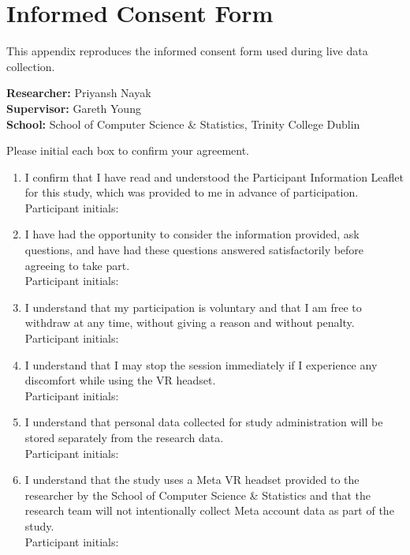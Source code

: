 \chapter{Informed Consent Form}
\label{app:consent}

\begingroup
\setlength{\parindent}{0pt}
\setlength{\parskip}{0.8em}

This appendix reproduces the informed consent form used during live data collection.

\textbf{Researcher:} Priyansh Nayak\\
\textbf{Supervisor:} Gareth Young\\
\textbf{School:} School of Computer Science \& Statistics, Trinity College Dublin

Please initial each box to confirm your agreement.

\begin{enumerate}
\item I confirm that I have read and understood the Participant Information Leaflet for this study, which was provided to me in advance of participation.\\[0.5em]
Participant initials: \hrulefill

\item I have had the opportunity to consider the information provided, ask questions, and have had these questions answered satisfactorily before agreeing to take part.\\[0.5em]
Participant initials: \hrulefill

\item I understand that my participation is voluntary and that I am free to withdraw at any time, without giving a reason and without penalty.\\[0.5em]
Participant initials: \hrulefill

\item I understand that I may stop the session immediately if I experience any discomfort while using the VR headset.\\[0.5em]
Participant initials: \hrulefill

\item I understand that personal data collected for study administration will be stored separately from the research data.\\[0.5em]
Participant initials: \hrulefill

\item I understand that the study uses a Meta VR headset provided to the researcher by the School of Computer Science \& Statistics and that the research team will not intentionally collect Meta account data as part of the study.\\[0.5em]
Participant initials: \hrulefill


\end{enumerate}
